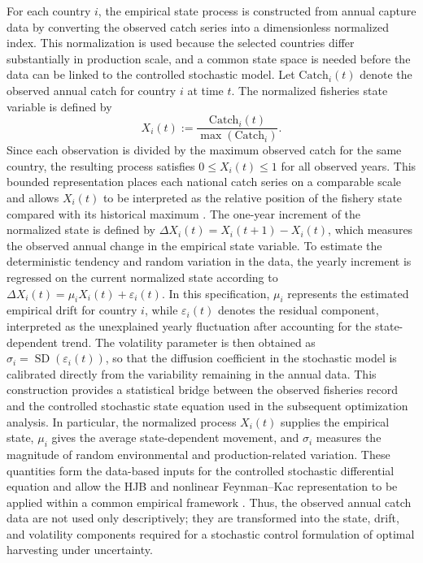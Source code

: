 \documentclass[11pt]{article}
\begin{document}
	For each country $i$, the empirical state process is constructed from annual capture data by converting the observed catch series into a dimensionless normalized index. This normalization is used because the selected countries differ substantially in production scale, and a common state space is needed before the data can be linked to the controlled stochastic model. Let $\text{Catch}_i(t)$ denote the observed annual catch for country $i$ at time $t$. The normalized fisheries state variable is defined by
	\begin{equation}
		X_i(t):=
		\frac{\text{Catch}_i(t)}
		{\max(\text{Catch}_i)}.
		\label{eq:normalization}
	\end{equation}
	Since each observation is divided by the maximum observed catch for the same country, the resulting process satisfies $0\leq X_i(t)\leq 1$ for all observed years. This bounded representation places each national catch series on a comparable scale and allows $X_i(t)$ to be interpreted as the relative position of the fishery state compared with its historical maximum \citep{ellington2025playmydata,ellington2025metascorelens}. The one-year increment of the normalized state is defined by $\Delta X_i(t)=X_i(t+1)-X_i(t)$, which measures the observed annual change in the empirical state variable. To estimate the deterministic tendency and random variation in the data, the yearly increment is regressed on the current normalized state according to
	$\Delta X_i(t)=\mu_iX_i(t)+\varepsilon_i(t).$
	In this specification, $\mu_i$ represents the estimated empirical drift for country $i$, while $\varepsilon_i(t)$ denotes the residual component, interpreted as the unexplained yearly fluctuation after accounting for the state-dependent trend. The volatility parameter is then obtained as $\sigma_i=\operatorname{SD}(\varepsilon_i(t))$, so that the diffusion coefficient in the stochastic model is calibrated directly from the variability remaining in the annual data. This construction provides a statistical bridge between the observed fisheries record and the controlled stochastic state equation used in the subsequent optimization analysis. In particular, the normalized process $X_i(t)$ supplies the empirical state, $\mu_i$ gives the average state-dependent movement, and $\sigma_i$ measures the magnitude of random environmental and production-related variation. These quantities form the data-based inputs for the controlled stochastic differential equation and allow the HJB and nonlinear Feynman--Kac representation to be applied within a common empirical framework \citep{valdez2025association,valdez2025exploring}. Thus, the observed annual catch data are not used only descriptively; they are transformed into the state, drift, and volatility components required for a stochastic control formulation of optimal harvesting under uncertainty.
	
\end{document}
